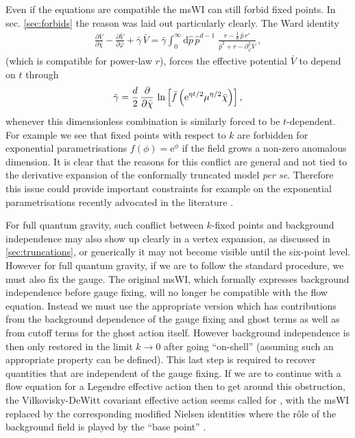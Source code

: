 \documentclass[11pt]{book} %
\newcommand{\bc}{\bar \chi}
\newcommand{\bV}{\bar V}
\numberwithin{equation}{chapter}
\begin{document}
Even if the equations are compatible the msWI can still forbid fixed points.
In sec. \ref{sec:forbids} the reason was laid out particularly clearly. The Ward identity
\begin{align}
  \frac{\partial \bar V}{\partial \bar\chi} - \frac{\partial \bar V}{\partial \bar\varphi} + \bar \gamma \, \bar V = \bar \gamma
  \int_0^{\infty} \mathrm d\hat p \, \hat p^{d-1} \; \frac{r - \frac{1}{d} \, \hat p \, r'}{\hat p^2 + r - \partial^2_{\bar\varphi}\bar V} \,,
\end{align}
(which is compatible for power-law $r$),
forces the effective potential $\bV$ to depend on $t$ through
\begin{align}
  \bar{\gamma} = \frac{d}{2} \, \frac{\partial}{\partial\bc} \,
  \ln \left[ \bar{f} \left({\rm e}^{\eta t/2}\mu^{\eta/2}\bc \right) \right] ,
\end{align}
whenever this dimensionless combination is similarly forced to be $t$-dependent.
For example we see that fixed points with respect to $k$ are forbidden for exponential parametrisations
$f(\phi) = \mathrm e ^ \phi$  if the field grows a non-zero anomalous dimension.
It is clear that the reasons for this conflict are general and not tied to the derivative expansion
of the conformally truncated model \textit{per se}.
Therefore this issue could provide important constraints for example on the exponential parametrisations
recently advocated in the literature
\cite{Demmel:2015zfa,Eichhorn:2013xr,Eichhorn:2015bna,Nink:2014yya,Percacci:2015wwa,
Labus:2015ska,Ohta:2015efa,Gies:2015tca}.

For full quantum gravity, such conflict between $k$-fixed points and background independence may also
show up clearly in a vertex expansion, as discussed in \ref{sec:truncations},
or generically it may not become visible until the six-point level.
However for full quantum gravity, if we are to follow the standard procedure, we must also fix the gauge.
The original msWI, which formally expresses background independence before gauge fixing,
will no longer be compatible with the flow equation.
Instead we must use the appropriate version which has contributions from the background dependence of
the gauge fixing and ghost terms as well as from cutoff terms for the ghost action itself.
However background independence is then only restored in the limit $k\to0$ after going ``on-shell''
(assuming such an appropriate property can be defined).
This last step is required to recover quantities that are independent of the gauge fixing.
If we are to continue with a flow equation for a Legendre effective action
\cite{Wetterich:1992yh,Morris:1993qb} then to get around this obstruction,
the Vilkovisky-DeWitt covariant effective action seems called for
\cite{Branchina:2003ek,Donkin:2012ud,Demmel:2014hla,Safari:2015dva},
with the msWI replaced by the corresponding modified Nielsen identities where the r\^ole of the background
field is played by the ``base point'' \cite{Pawlowski:2003sk}.
\end{document}
